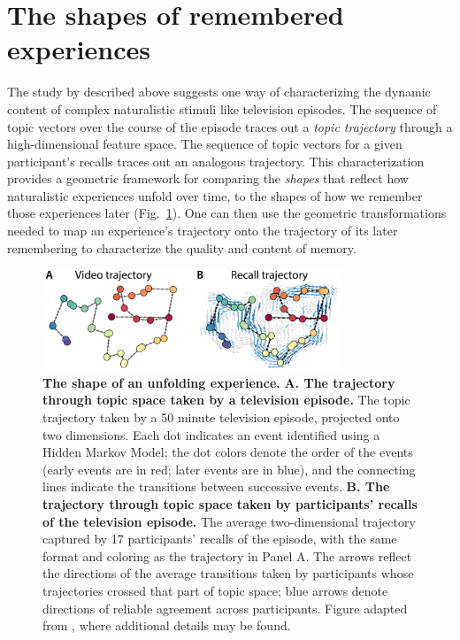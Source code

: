 \documentclass{article}
\begin{document}
\section*{The shapes of remembered experiences}
The study by \cite{HeusEtal18c} described above suggests one way of characterizing the dynamic content of complex naturalistic stimuli like television episodes.  The sequence of topic vectors over the course of the episode traces out a \textit{topic trajectory} through a high-dimensional feature space.  The sequence of topic vectors for a given participant's recalls traces out an analogous trajectory.  This characterization provides a geometric framework for comparing the \textit{shapes} that reflect how naturalistic experiences unfold over time, to the shapes of how we remember those experiences later (Fig.~\ref{fig:trajectories}).  One can then use the geometric transformations needed to map an experience's trajectory onto the trajectory of its later remembering to characterize the quality and content of memory.

\begin{figure}[tp]
\centering
\includegraphics[width=0.8\textwidth]{figs/trajectory}
\caption{\textbf{The shape of an unfolding experience.}  \textbf{A. The trajectory through topic space taken by a television episode.} The topic trajectory taken by a 50 minute television episode, projected onto two dimensions.  Each dot indicates an event identified using a Hidden Markov Model; the dot colors denote the order of the events (early events are in red; later events are in blue), and the connecting lines indicate the transitions between successive events.  \textbf{B. The trajectory through topic space taken by participants' recalls of the television episode.} The average two-dimensional trajectory captured by 17 participants' recalls of the episode, with the same format and coloring as the trajectory in Panel A. The arrows reflect the directions of the average transitions taken by participants whose trajectories crossed that part of topic space; blue arrows denote directions of reliable agreement across participants.  Figure adapted from \cite{HeusEtal18c}, where additional details may be found.}
\label{fig:trajectories}
\end{figure}
\end{document}
